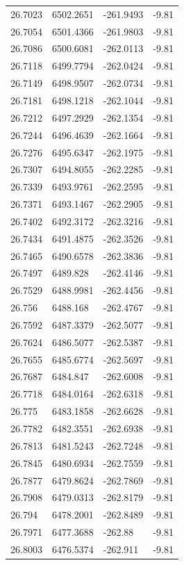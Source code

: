 \begin{table}[H]
\begin{tabular}{llll}
26.7023 & 6502.2651 & -261.9493 & -9.81 \\
26.7054 & 6501.4366 & -261.9803 & -9.81 \\
26.7086 & 6500.6081 & -262.0113 & -9.81 \\
26.7118 & 6499.7794 & -262.0424 & -9.81 \\
26.7149 & 6498.9507 & -262.0734 & -9.81 \\
26.7181 & 6498.1218 & -262.1044 & -9.81 \\
26.7212 & 6497.2929 & -262.1354 & -9.81 \\
26.7244 & 6496.4639 & -262.1664 & -9.81 \\
26.7276 & 6495.6347 & -262.1975 & -9.81 \\
26.7307 & 6494.8055 & -262.2285 & -9.81 \\
26.7339 & 6493.9761 & -262.2595 & -9.81 \\
26.7371 & 6493.1467 & -262.2905 & -9.81 \\
26.7402 & 6492.3172 & -262.3216 & -9.81 \\
26.7434 & 6491.4875 & -262.3526 & -9.81 \\
26.7465 & 6490.6578 & -262.3836 & -9.81 \\
26.7497 & 6489.828 & -262.4146 & -9.81 \\
26.7529 & 6488.9981 & -262.4456 & -9.81 \\
26.756 & 6488.168 & -262.4767 & -9.81 \\
26.7592 & 6487.3379 & -262.5077 & -9.81 \\
26.7624 & 6486.5077 & -262.5387 & -9.81 \\
26.7655 & 6485.6774 & -262.5697 & -9.81 \\
26.7687 & 6484.847 & -262.6008 & -9.81 \\
26.7718 & 6484.0164 & -262.6318 & -9.81 \\
26.775 & 6483.1858 & -262.6628 & -9.81 \\
26.7782 & 6482.3551 & -262.6938 & -9.81 \\
26.7813 & 6481.5243 & -262.7248 & -9.81 \\
26.7845 & 6480.6934 & -262.7559 & -9.81 \\
26.7877 & 6479.8624 & -262.7869 & -9.81 \\
26.7908 & 6479.0313 & -262.8179 & -9.81 \\
26.794 & 6478.2001 & -262.8489 & -9.81 \\
26.7971 & 6477.3688 & -262.88 & -9.81 \\
26.8003 & 6476.5374 & -262.911 & -9.81 \\

\end{tabular}
\end{table}

